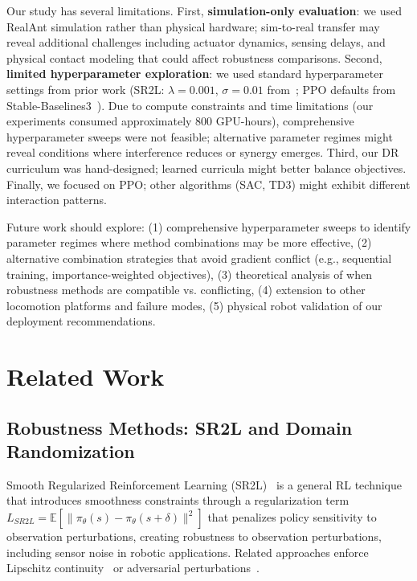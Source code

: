 \documentclass[conference]{IEEEtran}
\begin{document}
Our study has several limitations. First, \textbf{simulation-only evaluation}: we used RealAnt simulation rather than physical hardware; sim-to-real transfer may reveal additional challenges including actuator dynamics, sensing delays, and physical contact modeling that could affect robustness comparisons. Second, \textbf{limited hyperparameter exploration}: we used standard hyperparameter settings from prior work (SR2L: $\lambda=0.001$, $\sigma=0.01$ from~\cite{shen2020deep}; PPO defaults from Stable-Baselines3~\cite{raffin2021stable}). Due to compute constraints and time limitations (our experiments consumed approximately 800 GPU-hours), comprehensive hyperparameter sweeps were not feasible; alternative parameter regimes might reveal conditions where interference reduces or synergy emerges. Third, our DR curriculum was hand-designed; learned curricula might better balance objectives. Finally, we focused on PPO; other algorithms (SAC, TD3) might exhibit different interaction patterns.

Future work should explore: (1) comprehensive hyperparameter sweeps to identify parameter regimes where method combinations may be more effective, (2) alternative combination strategies that avoid gradient conflict (e.g., sequential training, importance-weighted objectives), (3) theoretical analysis of when robustness methods are compatible vs. conflicting, (4) extension to other locomotion platforms and failure modes, (5) physical robot validation of our deployment recommendations.

\section{Related Work}

\subsection{Robustness Methods: SR2L and Domain Randomization}

Smooth Regularized Reinforcement Learning (SR2L)~\cite{shen2020deep} is a general RL technique that introduces smoothness constraints through a regularization term $L_{SR2L} = \mathbb{E}[\|\pi_\theta(s) - \pi_\theta(s+\delta)\|^2]$ that penalizes policy sensitivity to observation perturbations, creating robustness to observation perturbations, including sensor noise in robotic applications. Related approaches enforce Lipschitz continuity~\cite{yu22f} or adversarial perturbations~\cite{pinto2017robust}.
\end{document}
